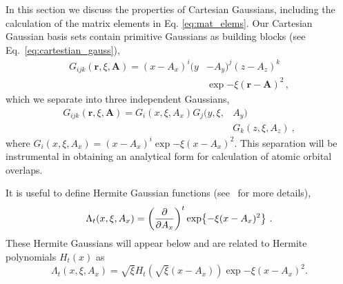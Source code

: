 \documentclass[
    prd, twocolumn, superscriptaddress, nofootinbib, amsmath, amssymb,
    aps, floatfix,preprintnumbers
]{revtex4-2}
\begin{document}
    In this section we discuss the properties of Cartesian Gaussians, including the calculation of the matrix elements in Eq. \eqref{eq:mat_elems}. Our Cartesian Gaussian basis sets contain primitive Gaussians as building blocks (see Eq.~\eqref{eq:cartestian_gauss}), 
    \begin{equation}
    \begin{split}
        G_{ijk} (\mathbf{r}, \xi, \mathbf{A}) = (x - A_x)^i (y& - A_y)^j (z - A_z)^k\\& \exp{ - \xi (\mathbf{r} - \mathbf{A})^2}\,,
    \end{split}
    \end{equation}
    which we separate into three independent Gaussians, 
    \begin{equation}
        \begin{split}
            G_{ijk} (\mathbf{r}, \xi, \mathbf{A}) = G_i(x, \xi, A_x) G_j (y, \xi,& A_y)\\&G_k(z, \xi, A_z)\ ,
        \end{split}
    \end{equation}
    where $\displaystyle G_i(x, \xi, A_x) = (x - A_x)^i \exp{-\xi(x - A_x)^2}.$ This separation will be instrumental in obtaining an analytical form for calculation of atomic orbital overlaps.
    
    It is useful to define Hermite Gaussian functions (see~\cite{GaussianBook} for more details), 
    \begin{equation}
        \Lambda_t(x, \xi, A_x) = \left(\pdv{}{A_x}\right)^t \exp{-\xi(x - A_x)^2}\ .
    \end{equation}
    These Hermite Gaussians will appear below and are related to Hermite polynomials $H_t(x)$ as
    \begin{equation}
        \Lambda_t (x, \xi, A_x) = \sqrt{\xi} H_t\left(\sqrt{\xi} (x - A_x)\right)\exp{-\xi(x - A_x)^2}.
    \end{equation}
    
\end{document}
